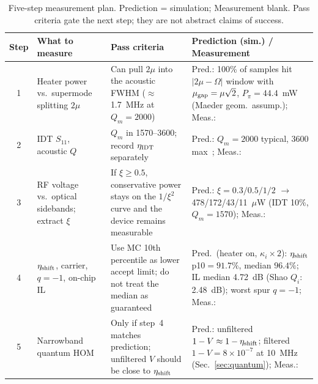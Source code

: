 \documentclass[aps,prapplied,reprint,superscriptaddress,amsmath,amssymb,floatfix]{revtex4-2}
\newcommand{\etash}{\eta_{\rm shift}}
\begin{document}
\begin{table}[t]
\caption{Five-step measurement plan. Prediction = simulation; Measurement blank. Pass criteria gate the next step; they are not abstract claims of success.}
\label{tab:plan}
\begin{ruledtabular}
\begin{tabular}{clp{}p{}}
Step & What to measure & Pass criteria & Prediction (sim.) / Measurement \\
\hline
1 & Heater power vs.\ supermode splitting $2\mu$ & Can pull $2\mu$ into the acoustic FWHM ($\approx$1.7~MHz at $Q_m=2000$) & Pred.: 100\% of samples hit $|2\mu-\Omega|$ window with $\mu_{\rm gap}=\mu\sqrt{2}$, $P_\pi=44.4$~mW (Maeder geom.\ assump.); Meas.: \\
2 & IDT $S_{11}$, acoustic $Q$ & $Q_m$ in 1570--3600; record $\eta_{\rm IDT}$ separately & Pred.: $Q_m=2000$ typical, 3600 max~\cite{Shao2019}; Meas.: \\
3 & RF voltage vs.\ optical sidebands; extract $\xi$ & If $\xi\ge0.5$, conservative power stays on the $1/\xi^2$ curve and the device remains measurable & Pred.: $\xi=0.3/0.5/1/2$ $\to$ 478/172/43/11~$\mu$W (IDT 10\%, $Q_m=1570$); Meas.: \\
4 & $\etash$, carrier, $q=-1$, on-chip IL & Use MC 10th percentile as lower accept limit; do not treat the median as guaranteed & Pred.\ (heater on, $\kappa_i\times2$): $\etash$ p10$=91.7\%$, median $96.4\%$; IL median 4.72~dB (Shao $Q_i$: 2.48~dB); worst spur $q=-1$; Meas.: \\
5 & Narrowband quantum HOM & Only if step~4 matches prediction; unfiltered $V$ should be close to $\etash$ & Pred.: unfiltered $1-V\approx1-\etash$; filtered $1-V=8\times10^{-7}$ at 10~MHz (Sec.~\ref{sec:quantum}); Meas.: \\
\end{tabular}
\end{ruledtabular}
\end{table}
\end{document}
